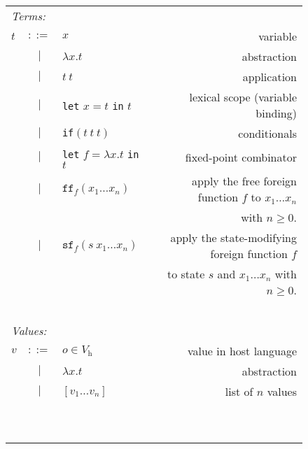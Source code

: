 \begin{figure}[p]
    \begin{tabular}{l c l r}
        \multicolumn{4}{l}{\emph{Terms:}}\\
        $t$ & $::=$ & $x$ & variable\\
        & $|$ & $\lambda x.t$ & abstraction\\
        & $|$ & $t\ t$ & application\\
        & $|$ & \texttt{let} $x = t$ \texttt{in} $t$ & lexical scope (variable binding)\\
        & $|$ & \texttt{if}$(t\ t\ t)$ & conditionals\\
        & $|$ & \texttt{let} $f = \lambda x.t$ \texttt{in} $t$ & fixed-point combinator\\
        & $|$ & $\texttt{ff}_f (x_1 \dots x_n)$ & apply the free foreign function $f$ to $x_1 \dots x_n$\\
        &&& with $n \geq 0$.\\
        & $|$ & $\texttt{sf}_f (s\ x_1 \dots x_n)$ & apply the state-modifying foreign function $f$\\
        &&& to state $s$ and $x_1 \dots x_n$ with $n \geq 0$.\\\ \\
    
        \multicolumn{4}{l}{\emph{Values:}}\\
        $v$ & $::=$ & $o \in V_\text{h}$ & value in host language\\
        & $|$ & $\lambda x.t$ & abstraction\\
        & $|$ & $[ v_1 \dots v_n ]$ & list of $n$ values\\\ \\ \
    \end{tabular}
    

\end{figure}
